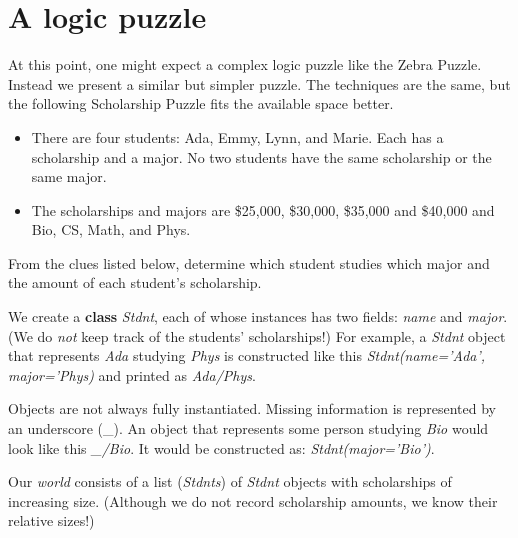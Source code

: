 \section{A logic puzzle}\label{sec:logic-puzzle}

At this point, one might expect a complex logic puzzle like the Zebra Puzzle\cite{ZebraPuzzle}. Instead we present a similar but simpler puzzle. The techniques are the same, but the following Scholarship Puzzle\cite{ScholarshipPuzzle} fits the available space better. 


\begin{itemize}
    \item There are four students: Ada, Emmy, Lynn, and Marie. Each has a scholarship and a major.  No two students have the same scholarship or the same major. 
    \item The scholarships and majors are \$25,000, \$30,000, \$35,000 and \$40,000 and Bio, CS, Math, and Phys. 
\end{itemize}

From the clues listed below, determine which student studies which major and the amount of each student's scholarship.

We create a \textbf{class} \textit{Stdnt}, each of whose instances has two fields: \textit{name} and \textit{major}. (We do \textit{not} keep track of the students' scholarships!) For example, a \textit{Stdnt} object that represents \textit{Ada} studying \textit{Phys} is constructed like this \textit{Stdnt(name='Ada', major='Phys)} and printed as \textit{Ada/Phys}. 

Objects are not always fully instantiated. Missing information is represented by an underscore (\_). An object that represents some person studying \textit{Bio} would look like this \textit{\_/Bio}. It would be constructed as: \textit{Stdnt(major='Bio')}.

Our \textit{world} consists of a list (\textit{Stdnts}) of \textit{Stdnt} objects with scholarships of increasing size. (Although we do not record scholarship amounts, we know their relative sizes!)

